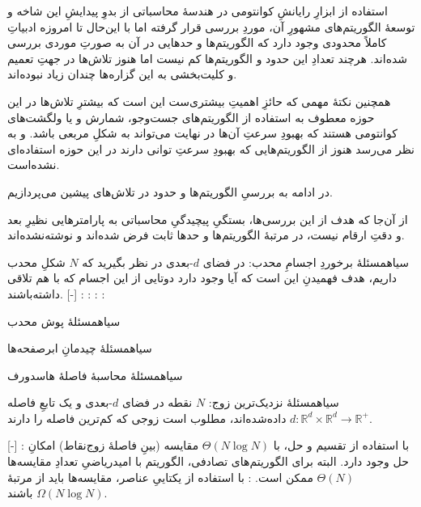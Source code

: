

استفاده از ابزارِ رایانشِ کوانتومی در هندسهٔ محاسباتی از بدوِ پیدایشِ این شاخه و توسعهٔ الگوریتم‌های مشهورِ آن، موردِ بررسی قرار گرفته  اما با این‌حال تا امروزه ادبیاتِ کاملاً محدودی وجود دارد که الگوریتم‌ها و حدهایی در آن به صورتِ‌ موردی بررسی شده‌اند. هرچند تعدادِ این حدود و الگوریتم‌ها کم نیست اما هنوز تلاش‌ها در جهتِ تعمیم و کلیت‌بخشی به این گزاره‌ها چندان زیاد نبوده‌اند.

همچنین نکتهٔ مهمی که حائزِ اهمیتِ بیشتری‌ست این است که بیشترِ تلاش‌ها در این حوزه معطوف به استفاده از الگوریتم‌های جست‌وجو، شمارش و یا ولگشت‌های کوانتومی هستند که بهبودِ سرعتِ آن‌ها در نهایت می‌تواند به شکلِ مربعی  باشد. و به نظر می‌رسد هنوز از الگوریتم‌هایی که بهبودِ سرعتِ توانی
 دارند در این حوزه استفاده‌ای نشده‌است. 

در ادامه به بررسیِ الگوریتم‌ها و حدود در تلاش‌های پیشین می‌پردازیم.

از آن‌جا که هدف از این بررسی‌ها، بستگیِ پیچیدگیِ محاسباتی به پارامترهایی نظیرِ بعد و دقتِ ارقام نیست، در مرتبهٔ الگوریتم‌ها و حدها ثابت فرض شده‌اند و نوشته‌نشده‌اند.

‌سیاه{مسئلهٔ برخوردِ اجسامِ محدب}: در فضای $d$-بعدی در نظر بگیرید که $N$ شکلِ محدب داریم، هدف فهمیدنِ این است که آیا وجود دارد دوتایی از این اجسام که با هم تلاقی داشته‌باشند. 
[-]
:
:
:
:

‌سیاه{مسئلهٔ پوش محدب}

‌سیاه{مسئلهٔ چیدمانِ ابرصفحه‌ها}

‌سیاه{مسئلهٔ محاسبهٔ فاصلهٔ هاسدورف}


‌سیاه{مسئلهٔ نزدیک‌ترین زوج}: 
\(N\)
نقطه در فضای \(d\)-بعدی و یک تابعِ فاصله 
\(d: \mathbb{R}^d \times \mathbb{R}^d \to \mathbb{R}^+\)
داده‌شده‌اند، مطلوب است زوجی که کم‌ترین فاصله را دارند. 

[-]
: با استفاده از تقسیم و حل، با 
$\Theta(N \log N)$ 
مقایسه (بینِ فاصلهٔ زوج‌نقاط)
امکانِ حل وجود دارد.
البته برای الگوریتم‌های تصادفی، الگوریتم با امیدریاضیِ تعدادِ مقایسه‌ها
$\Theta(N)$
ممکن است.
: با استفاده از یکتاییِ عناصر، مقایسه‌ها باید از مرتبهٔ
$\Omega(N \log N)$
باشند.

